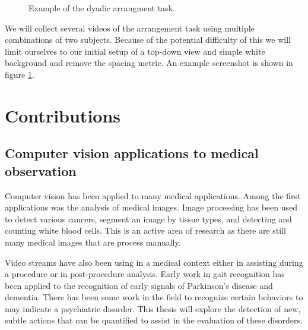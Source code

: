 \documentclass[11pt]{article}
\begin{document}
\begin{figure}%
    \centering
    \caption{Example of the dyadic arrangment task.}
    \label{dyadic}%
\end{figure}

We will collect several videos of the arrangement task using multiple combinations of two subjects. Because of the potential difficulty of this we will limit ourselves to our initial setup of a top-down view and simple white background and remove the spacing metric. An example screenshot is shown in figure \ref{dyadic}.
\section{Contributions}
\subsection{Computer vision applications to medical observation}
Computer vision has been applied to many medical applications. Among the first applications was the analysis of medical images. Image processing has been used to detect various cancers, segment an image by tissue types, and detecting and counting white blood cells. This is an active area of research as there are still many medical images that are process manually.

Video streams have also been using in a medical context either in assisting during a procedure or in post-procedure analysis. Early work in gait recognition has been applied to the recognition of early signals of Parkinson's disease and dementia. There has been some work in the field to recognize certain behaviors to may indicate a psychiatric disorder. This thesis will explore the detection of new, subtle actions that can be quantified to assist in the evaluation of these disorders.
\end{document}
